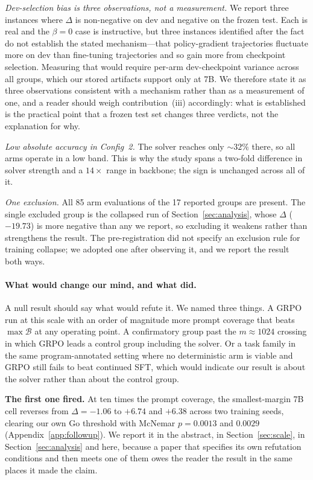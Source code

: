 \emph{Dev-selection bias is three observations, not a measurement.} We report
three instances where $\Delta$ is non-negative on dev and negative on the frozen
test. Each is real and the $\beta{=}0$ case is instructive, but three instances
identified after the fact do not establish the stated mechanism---that
policy-gradient trajectories fluctuate more on dev than fine-tuning trajectories
and so gain more from checkpoint selection. Measuring that would require
per-arm dev-checkpoint variance across all groups, which our stored artifacts
support only at 7B. We therefore state it as three observations consistent with
a mechanism rather than as a measurement of one, and a reader should weigh
contribution~(iii) accordingly: what is established is the practical point that
a frozen test set changes three verdicts, not the explanation for why.

\emph{Low absolute accuracy in Config~2.} The solver reaches only ${\sim}32\%$
there, so all arms operate in a low band. This is why the study spans a two-fold
difference in solver strength and a $14\times$ range in backbone; the sign is
unchanged across all of it.

\emph{One exclusion.} All 85 arm evaluations of the 17 reported groups are
present. The single excluded group is the collapsed run of
Section~\ref{sec:analysis}, whose $\Delta$ ($-19.73$) is more negative than any
we report, so excluding it weakens rather than strengthens the result. The
pre-registration did not specify an exclusion rule for training collapse; we
adopted one after observing it, and we report the result both ways.

\paragraph{What would change our mind, and what did.}
A null result should say what would refute it. We named three things. A GRPO run
at this scale with an order of magnitude more prompt coverage that beats
$\max\mathcal{B}$ at any operating point. A confirmatory group past the
$m \approx 1024$ crossing in which GRPO leads a control group including the
solver. Or a task family in the same program-annotated setting where no
deterministic arm is viable and GRPO still fails to beat continued SFT, which
would indicate our result is about the solver rather than about the control
group.

\textbf{The first one fired.} At ten times the prompt coverage, the
smallest-margin 7B cell reverses from $\Delta = -1.06$ to $+6.74$ and $+6.38$
across two training seeds, clearing our own Go threshold with McNemar
$p = 0.0013$ and $0.0029$ (Appendix~\ref{app:followup}). We report it in the
abstract, in Section~\ref{sec:scale}, in Section~\ref{sec:analysis} and here,
because a paper that specifies its own refutation conditions and then meets one
of them owes the reader the result in the same places it made the claim.

